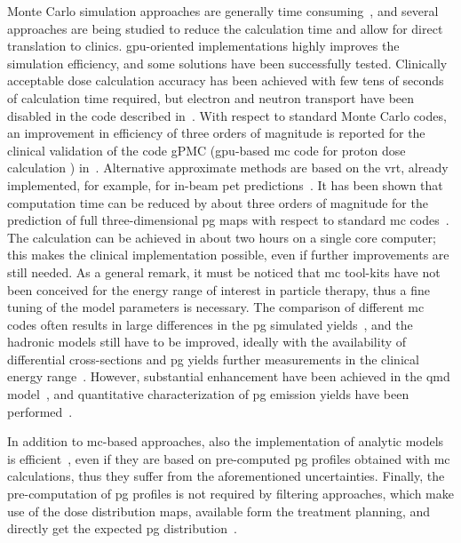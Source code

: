 Monte Carlo simulation approaches are generally time consuming~\parencite{Robert2013, Dedes2015, Schumann2015}, and several approaches are being studied to reduce the calculation time and allow for direct translation to clinics. \gls{gpu}-oriented implementations highly improves the simulation efficiency, and some solutions have been successfully tested. Clinically acceptable dose calculation accuracy has been achieved with few tens of seconds of calculation time required, but electron and neutron transport have been disabled in the code described in~\cite{Qin2017}. With respect to standard Monte Carlo codes, an improvement in efficiency of three orders of magnitude is reported for the clinical validation of the code gPMC (\gls{gpu}-based \gls{mc} code for proton dose calculation ) in~\cite{Giantsoudi2015}. 
Alternative approximate methods are based on the \gls{vrt}, already implemented, for example, for in-beam \gls{pet} predictions~\parencite{Sommerer2009}. It has been shown that computation time can be reduced by about three orders of magnitude for the prediction of full three-dimensional \gls{pg} maps with respect to standard \gls{mc} codes~\parencite{Huismann2016, ElKanawati2015}. The calculation can be achieved in about two hours on a single core computer; this makes the clinical implementation possible, even if further improvements are still needed.  
As a general remark, it must be noticed that \gls{mc} tool-kits have not been conceived for the energy range of interest in particle therapy, thus a fine tuning of the model parameters is necessary. The comparison of different \gls{mc} codes often results in large differences in the \gls{pg} simulated yields~\parencite{Bohlen2010, Verburg2012, Schumann2015}, and the hadronic models still have to be improved, ideally with the availability of differential cross-sections and \gls{pg} yields further measurements in the clinical energy range~\parencite{Newhauser2015}. However, substantial enhancement have been achieved in the \gls{qmd} model~\parencite{Dedes2014}, and quantitative characterization of \gls{pg} emission yields have been performed~\parencite{Schumann2015, Pinto2016}.

In addition to \gls{mc}-based approaches, also the implementation of analytic models is efficient~\parencite{Sterpin2015, Russo2016}, even if they are based on pre-computed \gls{pg} profiles obtained with \gls{mc} calculations, thus they suffer from the aforementioned uncertainties.
Finally, the pre-computation of \gls{pg} profiles is not required by filtering approaches, which make use of the dose distribution maps, available form the treatment planning, and directly get the expected \gls{pg} distribution~\parencite{Kroniger2015}.  
  

